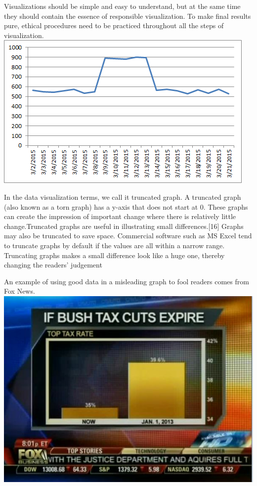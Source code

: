 \documentclass[]{book}
\theoremstyle{definition}
\theoremstyle{definition}
\theoremstyle{definition}
\theoremstyle{remark}
\begin{document}
Visualizations should be simple and easy to understand, but at the same
time they should contain the essence of responsible visualization. To
make final results pure, ethical procedures need to be practiced
throughout all the steps of visualization.
\includegraphics{images/Good_graph_extraction.png}

In the data visualization terms, we call it truncated graph. A truncated
graph (also known as a torn graph) has a y-axis that does not start at
0. These graphs can create the impression of important change where
there is relatively little change.Truncated graphs are useful in
illustrating small differences.{[}16{]} Graphs may also be truncated to
save space. Commercial software such as MS Excel tend to truncate graphs
by default if the values are all within a narrow range. Truncating
graphs makes a small difference look like a huge one, thereby changing
the readers' judgement

An example of using good data in a misleading graph to fool readers
comes from Fox News. \includegraphics{images/1.png}
\end{document}
